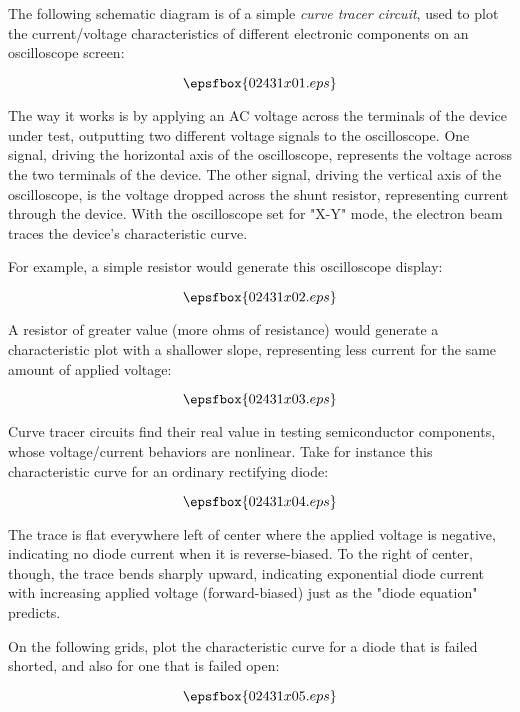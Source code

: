 

The following schematic diagram is of a simple {\it curve tracer circuit}, used to plot the current/voltage characteristics of different electronic components on an oscilloscope screen:

$$\epsfbox{02431x01.eps}$$

The way it works is by applying an AC voltage across the terminals of the device under test, outputting two different voltage signals to the oscilloscope.  One signal, driving the horizontal axis of the oscilloscope, represents the voltage across the two terminals of the device.  The other signal, driving the vertical axis of the oscilloscope, is the voltage dropped across the shunt resistor, representing current through the device.  With the oscilloscope set for "X-Y" mode, the electron beam traces the device's characteristic curve. 

For example, a simple resistor would generate this oscilloscope display:

$$\epsfbox{02431x02.eps}$$

A resistor of greater value (more ohms of resistance) would generate a characteristic plot with a shallower slope, representing less current for the same amount of applied voltage:

$$\epsfbox{02431x03.eps}$$

Curve tracer circuits find their real value in testing semiconductor components, whose voltage/current behaviors are nonlinear.  Take for instance this characteristic curve for an ordinary rectifying diode:

$$\epsfbox{02431x04.eps}$$

The trace is flat everywhere left of center where the applied voltage is negative, indicating no diode current when it is reverse-biased.  To the right of center, though, the trace bends sharply upward, indicating exponential diode current with increasing applied voltage (forward-biased) just as the "diode equation" predicts.

On the following grids, plot the characteristic curve for a diode that is failed shorted, and also for one that is failed open:

$$\epsfbox{02431x05.eps}$$






